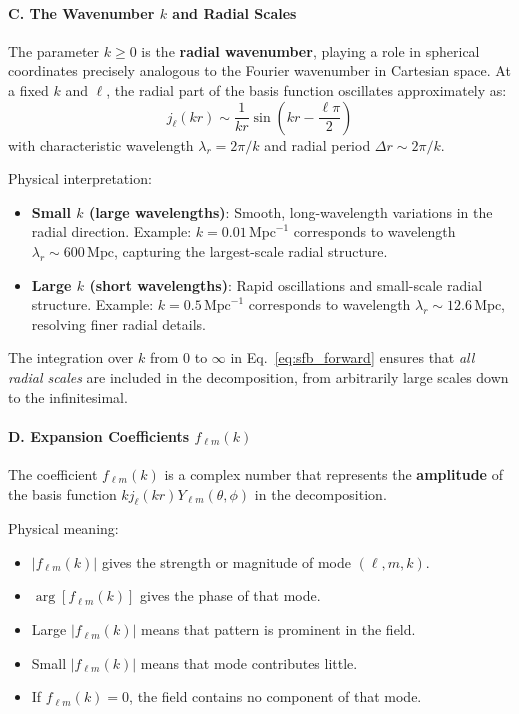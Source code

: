\paragraph{C. The Wavenumber $k$ and Radial Scales}

The parameter $k \geq 0$ is the \textbf{radial wavenumber}, playing a role in spherical coordinates precisely analogous to the Fourier wavenumber in Cartesian space. At a fixed $k$ and $\ell$, the radial part of the basis function oscillates approximately as:
\begin{equation}
j_\ell(kr) \sim \frac{1}{kr}\sin\left(kr - \frac{\ell\pi}{2}\right)
\end{equation}
with characteristic wavelength $\lambda_r = 2\pi / k$ and radial period $\Delta r \sim 2\pi / k$.

Physical interpretation:
\begin{itemize}
    \item \textbf{Small $k$ (large wavelengths)}: Smooth, long-wavelength variations in the radial direction. Example: $k = 0.01 \, \text{Mpc}^{-1}$ corresponds to wavelength $\lambda_r \sim 600 \, \text{Mpc}$, capturing the largest-scale radial structure.
    \item \textbf{Large $k$ (short wavelengths)}: Rapid oscillations and small-scale radial structure. Example: $k = 0.5 \, \text{Mpc}^{-1}$ corresponds to wavelength $\lambda_r \sim 12.6 \, \text{Mpc}$, resolving finer radial details.
\end{itemize}

The integration over $k$ from $0$ to $\infty$ in Eq.~\eqref{eq:sfb_forward} ensures that \emph{all radial scales} are included in the decomposition, from arbitrarily large scales down to the infinitesimal.

\paragraph{D. Expansion Coefficients $f_{\ell m}(k)$}

The coefficient $f_{\ell m}(k)$ is a complex number that represents the \textbf{amplitude} of the basis function $k j_\ell(kr) Y_{\ell m}(\theta, \phi)$ in the decomposition. 

Physical meaning:
\begin{itemize}
    \item $|f_{\ell m}(k)|$ gives the strength or magnitude of mode $(\ell, m, k)$.
    \item $\arg[f_{\ell m}(k)]$ gives the phase of that mode.
    \item Large $|f_{\ell m}(k)|$ means that pattern is prominent in the field.
    \item Small $|f_{\ell m}(k)|$ means that mode contributes little.
    \item If $f_{\ell m}(k) = 0$, the field contains no component of that mode.
\end{itemize}

